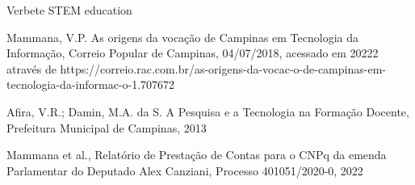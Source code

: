\documentclass[
12pt,		%
openright,	%
twoside,  %
a4paper,			%
chapter=TITLE,		%
english,			%
french,				%
spanish,			%
brazil				%
]{USPSC-classe/USPSC}
\begin{document}
\begin{flushleft}
\begin{flushleft}
\begin{flushleft}
\begin{flushleft}
[BRITANNICA, 2022a] Verbete STEM education
\end{flushleft}


\end{flushleft}


\end{flushleft}


\end{flushleft}


\begin{flushleft}
\begin{flushleft}
\begin{flushleft}
\begin{flushleft}
[MAMMANA, 2018] Mammana, V.P. As origens da voca\c{c}\~ao de Campinas em Tecnologia da Informa\c{c}\~ao, Correio Popular de Campinas, 04/07/2018, acessado em 20222 atrav\'es de https://correio.rac.com.br/as-origens-da-vocac-o-de-campinas-em-tecnologia-da-informac-o-1.707672
\end{flushleft}


\end{flushleft}


\end{flushleft}


\end{flushleft}


\begin{flushleft}
\begin{flushleft}
\begin{flushleft}
\begin{flushleft}
[AFIRA, 2013] Afira, V.R.; Damin, M.A. da S. A Pesquisa e a Tecnologia na Forma\c{c}\~ao Docente, Prefeitura Municipal de Campinas, 2013
\end{flushleft}


\end{flushleft}


\end{flushleft}


\end{flushleft}


\begin{flushleft}
\begin{flushleft}
\begin{flushleft}
\begin{flushleft}
[WASHCNPq, 2022] Mammana et al., Relat\'orio de Presta\c{c}\~ao de Contas para o CNPq da emenda Parlamentar do Deputado Alex Canziani, Processo 401051/2020-0, 2022
\end{flushleft}


\end{flushleft}


\end{flushleft}


\end{flushleft}
\end{document}

